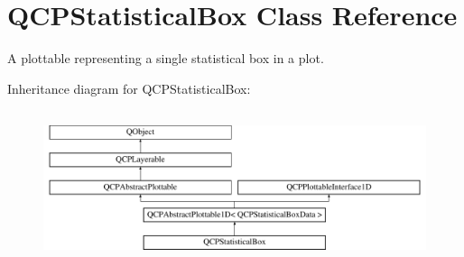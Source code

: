 \hypertarget{class_q_c_p_statistical_box}{}\section{Q\+C\+P\+Statistical\+Box Class Reference}
\label{class_q_c_p_statistical_box}


A plottable representing a single statistical box in a plot.  


Inheritance diagram for Q\+C\+P\+Statistical\+Box\+:\begin{figure}[H]
\begin{center}
\leavevmode
\includegraphics[height=4.530744cm]{class_q_c_p_statistical_box}
\end{center}
\end{figure}
